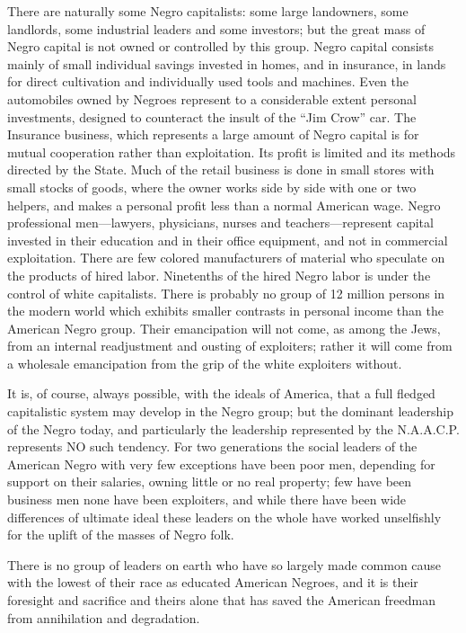 \documentclass[letterpaper,10pt,english]{jupyterBook}
\begin{document}
\sphinxAtStartPar
There are naturally some Negro capitalists: some large landowners, some landlords, some industrial leaders and some investors; but the great mass of Negro capital is not owned or controlled by this group. Negro capital consists mainly of small individual savings invested in homes, and in insurance, in lands for direct cultivation and individually used tools and machines. Even the automobiles owned by Negroes represent to a considerable extent personal investments, designed to counteract the insult of the “Jim Crow” car. The Insurance business, which represents a large amount of Negro capital is for mutual co\sphinxhyphen{}operation rather than exploitation. Its profit is limited and its methods directed by the State. Much of the retail business is done in small stores with small stocks of goods, where the owner works side by side with one or two helpers, and makes a personal profit less than a normal American wage. Negro professional men—lawyers, physicians, nurses and teachers—represent capital invested in their education and in their office equipment, and not in commercial exploitation. There are few colored manufacturers of material who speculate on the products of hired labor. Nine\sphinxhyphen{}tenths of the hired Negro labor is under the control of white capitalists. There is probably no group of 12 million persons in the modern world which exhibits smaller contrasts in personal income than the American Negro group. Their emancipation will not come, as among the Jews, from an internal readjustment and ousting of exploiters; rather it will come from a wholesale emancipation from the grip of the white exploiters without.

\sphinxAtStartPar
It is, of course, always possible, with the ideals of America, that a full fledged capitalistic system may develop in the Negro group; but the dominant leadership of the Negro today, and particularly the leadership represented by the N.A.A.C.P. represents NO such tendency. For two generations the social leaders of the American Negro with very few exceptions have been poor men, depending for support on their salaries, owning little or no real property; few have been business men none have been exploiters, and while there have been wide differences of ultimate ideal these leaders on the whole have worked unselfishly for the uplift of the masses of Negro folk.

\sphinxAtStartPar
There is no group of leaders on earth who have so largely made common cause with the lowest of their race as educated American Negroes, and it is their foresight and sacrifice and theirs alone that has saved the American freedman from annihilation and degradation.
\end{document}
